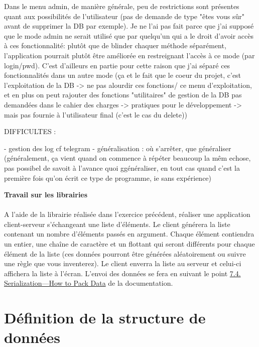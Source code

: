 \documentclass{article}
\begin{document}
    Dans le menu admin, de manière générale, peu de restrictions sont présentes quant aux possibilités de l'utilisateur (pas de demande de type "êtes vous sûr" avant de supprimer la DB par exemple).
    Je ne l'ai pas fait parce que j'ai supposé que le mode admin ne serait utilisé que par quelqu'un qui a le droit d'avoir accès à ces fonctionnalité: plutôt que de blinder chaquer méthode séparément, l'application pourrait plutôt être améliorée en restreignant l'accès à ce mode (par login/pwd). C'est d'ailleurs en partie pour cette raison que j'ai séparé ces fonctionnalités dans un autre mode (ça et le fait que le coeur du projet, c'est l'exploitation de la DB -> ne pas alourdir ces fonctions/ ce menu d'exploitation, et en plus on peut rajouter des fonctions "utilitaires" de gestion de la DB pas demandées dans le cahier des charges -> pratiques pour le développement -> mais pas fournie à l'utilisateur final (c'est le cas du delete))


    DIFFICULTES :

    - gestion des log cf telegram
    - généralisation : où s'arrêter, que généraliser (généralement, ça vient quand on commence à répéter beaucoup la mêm echose, pas possibel de savoit à l'avance quoi ggénéraliser, en tout cas quand c'est la première fois qu'on écrit ce type de programme, ie sans expérience)

    \begin{center}
        \textbf{\LARGE Travail sur les librairies}
    \end{center}

    \paragraph{}
    A l’aide de la librairie réalisée dans l’exercice précédent, réaliser une application client-serveur s’échangeant une liste d’éléments. Le client générera la liste contenant un nombre d’éléments passés en argument. Chaque élément contiendra un entier, une chaîne de caractère et un flottant qui seront différents pour chaque élément de la liste (ces données pourront être générées aléatoirement ou suivre une règle que vous inventerez). Le client enverra la liste au serveur et celui-ci affichera la liste à l’écran. L’envoi des données se fera en suivant le point \href{https://beej.us/guide/bgnet/html/#serialization}{7.4. Serialization—How to Pack Data} de la documentation.


    \section{Définition de la structure de données}
\end{document}
